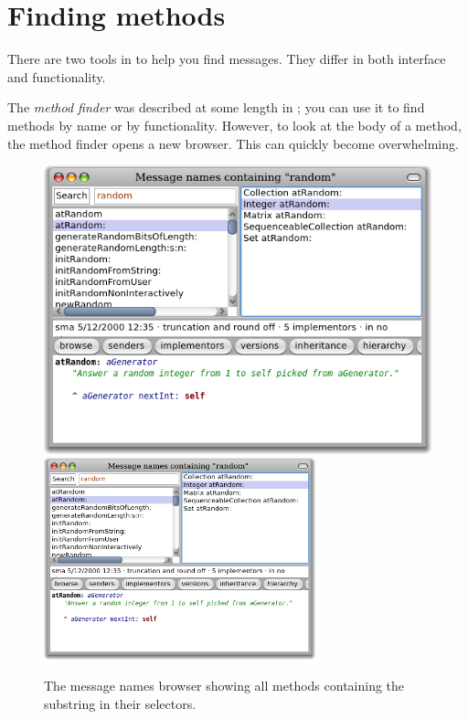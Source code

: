 \documentclass[a4paper,10pt,twoside]{book}
\begin{document}
\section{Finding methods}

There are two tools in \pharo to help you find messages.
They differ in both interface and functionality.

The \emph{method finder} was described at some length in ; you can use it to find methods by name or by functionality. 
However, to look at the body of a method, the method finder opens a new browser.
This can quickly become overwhelming.

\begin{figure}[btp]
	\begin{center}
	\ifluluelse
		{\includegraphics[width=\textwidth]{methodNamesRandom}}
		{\includegraphics[width=0.7\textwidth]{methodNamesRandom}}
	\end{center}
	\caption{The message names browser showing all methods containing the substring  in their selectors.}
\end{figure}
\end{document}
